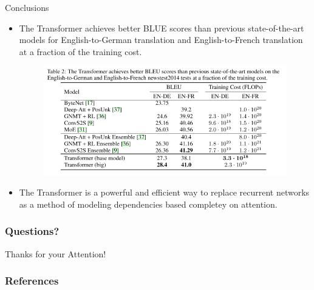 \documentclass[handout]{beamer}
\begin{document}
\begin{frame}{Conclusions}
\begin{scriptsize}
\begin{itemize}

 \item The Transformer achieves better BLUE scores than previous state-of-the-art models for English-to-German translation and English-to-French translation at a fraction of the training cost.

      \begin{figure}[h]
        	\includegraphics[scale = 0.29]{pics/transformerresults.png}
        \end{figure}  

\item The Transformer is a powerful and efficient way to replace recurrent networks as a method of modeling dependencies based completey on attention.

        
 
\end{itemize}

\end{scriptsize}


\end{frame}

\begin{frame}
\frametitle{Questions?}
\begin{center}\LARGE Thanks for your Attention!\\ \end{center}



\end{frame}

\begin{frame}[allowframebreaks]\scriptsize
\frametitle{References}


%
\end{frame}  


\end{document}
